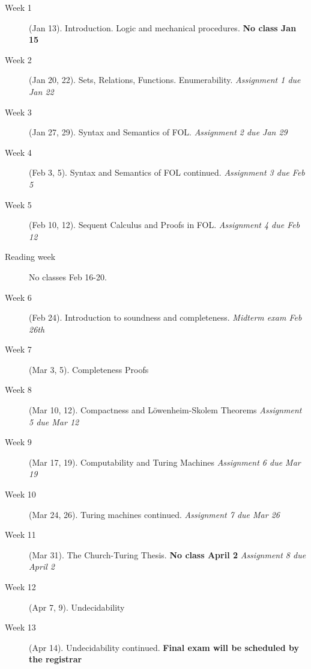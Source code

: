  
\begin{description}
\item[Week 1] (Jan 13). Introduction. Logic and mechanical procedures. \textbf{No class Jan 15}

\item[Week 2] (Jan 20, 22). Sets, Relations, Functions. Enumerability. \emph{Assignment 1 due Jan 22}

\item[Week 3] (Jan 27, 29). Syntax and Semantics of FOL. \emph{Assignment 2 due Jan 29}

\item[Week 4] (Feb 3, 5). Syntax and Semantics of FOL continued. \emph{Assignment 3 due Feb 5}

\item[Week 5] (Feb 10, 12). Sequent Calculus and Proofs in FOL. \emph{Assignment 4 due Feb 12}

\item[Reading week] No classes Feb 16-20.

\item[Week 6] (Feb 24). Introduction to soundness and completeness. \emph{Midterm exam Feb 26th}

\item[Week 7] (Mar 3, 5). Completeness Proofs

\item[Week 8] (Mar 10, 12). Compactness and L\"owenheim-Skolem Theorems \emph{Assignment 5 due Mar 12}

\item[Week 9] (Mar 17, 19). Computability and Turing Machines \emph{Assignment 6 due Mar 19}

\item[Week 10] (Mar 24, 26). Turing machines continued. \emph{Assignment 7 due Mar 26}

\item[Week 11] (Mar 31). The Church-Turing Thesis. \textbf{No class April 2} \emph{Assignment 8 due April 2}

\item[Week 12] (Apr 7, 9). Undecidability

\item[Week 13] (Apr 14). Undecidability continued. \textbf{Final exam will be scheduled by the registrar}
\end{description}

